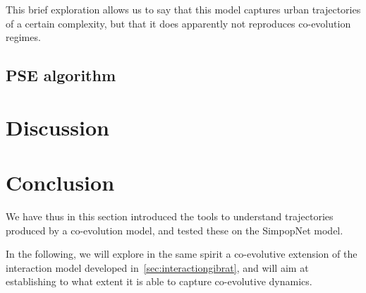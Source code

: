 This brief exploration allows us to say that this model captures urban trajectories of a certain complexity, but that it does apparently not reproduces co-evolution regimes.



\subsection{PSE algorithm}





\section{Discussion}






\section{Conclusion}


We have thus in this section introduced the tools to understand trajectories produced by a co-evolution model, and tested these on the SimpopNet model.

In the following, we will explore in the same spirit a co-evolutive extension of the interaction model developed in~\ref{sec:interactiongibrat}, and will aim at establishing to what extent it is able to capture co-evolutive dynamics.














\footnotesize

\begin{multicols}{2}


\end{multicols}






